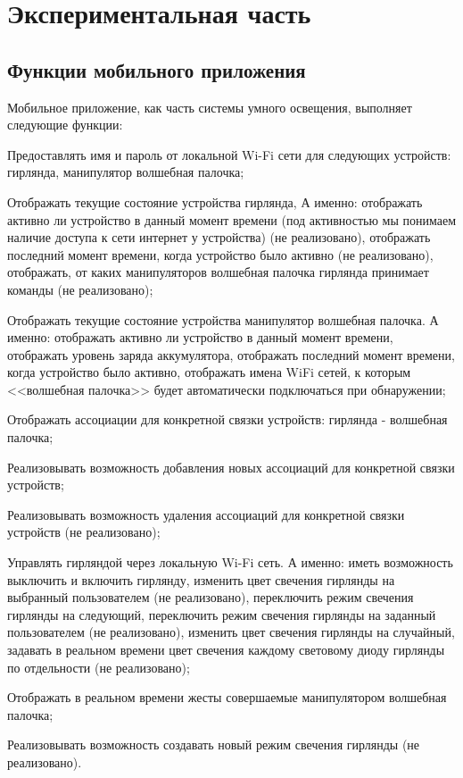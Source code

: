 \chapter{Экспериментальная часть}
 \section{Функции мобильного приложения}
 Мобильное приложение, как часть системы умного освещения, выполняет следующие функции:
\begin{description}
	\item Предоставлять имя и пароль от локальной Wi-Fi сети для следующих устройств: гирлянда, манипулятор волшебная палочка; 
	\item Отображать текущие состояние устройства гирлянда, А именно:
	отображать активно ли устройство в данный момент времени (под активностью мы понимаем наличие доступа к сети интернет у устройства) (не реализовано), отображать последний момент времени, когда устройство было активно (не реализовано), отображать, от каких манипуляторов волшебная палочка гирлянда принимает команды (не реализовано);
	\item Отображать текущие состояние устройства манипулятор волшебная палочка. А именно:
	отображать активно ли устройство в данный момент времени, отображать уровень заряда аккумулятора, отображать последний момент времени, когда устройство было активно, отображать имена WiFi сетей, к которым <<волшебная палочка>> будет автоматически подключаться при обнаружении; 
	\item Отображать ассоциации для конкретной связки устройств: гирлянда - волшебная палочка;
	\item Реализовывать возможность добавления новых ассоциаций для конкретной связки устройств;
	\item Реализовывать возможность удаления ассоциаций для конкретной связки устройств (не реализовано);
	\item Управлять гирляндой через локальную Wi-Fi сеть. А именно: иметь возможность выключить и включить гирлянду, изменить цвет свечения гирлянды на выбранный пользователем (не реализовано), переключить режим свечения гирлянды на следующий, переключить режим свечения гирлянды на заданный пользователем (не реализовано), изменить цвет свечения гирлянды на случайный, задавать в реальном времени цвет свечения каждому световому диоду гирлянды по отдельности (не реализовано);
	\item Отображать в реальном времени жесты совершаемые манипулятором волшебная палочка;
	\item Реализовывать возможность создавать новый режим свечения гирлянды (не реализовано).
\end{description}
